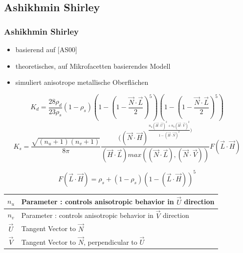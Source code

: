 \documentclass[11pt]{beamer}
\begin{document}
\subsection{Ashikhmin Shirley}
\begin{frame}[allowframebreaks]
\frametitle{Ashikhmin Shirley}

\begin{itemize}
\item basierend auf [AS00]
\item theoretisches, auf Mikrofacetten basierendes Modell
\item simuliert anisotrope metallische Oberflächen
\end{itemize}

\begin{equation}
K_d = \frac{28 \rho_d}{23 \rho_s} (1 - \rho_s)\left(1-\left(1- \frac{\vec{N} \cdot \vec{L}}{2}\right)^5\right)\left(1-\left(1-\frac{\vec{N} \cdot \vec{L}}{2}\right)^5\right)
\end{equation}
\begin{equation}
K_s = \frac{\sqrt{(n_u+1)(n_v+1)}}{8\pi} \frac{((\vec{N} \cdot \vec{H})^{ \frac{n_u(\vec{H} \cdot \vec{U})^2 + n_v(\vec{H} \cdot \vec{V})^2}{1-(\vec{H} \cdot \vec{N})^2})}}{(\vec{H} \cdot \vec{L}) max((\vec{N} \cdot \vec{L}),(\vec{N} \cdot \vec{V}))} F(\vec{L} \cdot \vec{H})
\end{equation}

\framebreak
\begin{equation}
F(\vec{L} \cdot \vec{H}) = \rho_s + (1-\rho_s)(1-(\vec{L} \cdot \vec{H}))^5
\end{equation}

\begin{table}[H]
\begin{tabular}{| c | l |}
\hline
$n_u$ & Parameter : controls anisotropic behavior in $\vec{U}$ direction\\ \hline
$n_v$ & Parameter : controls anisotropic behavior in $\vec{V}$ direction\\ \hline
$\vec{U}$ & Tangent Vector to $\vec{N}$\\ \hline
$\vec{V}$ & Tangent Vector to $\vec{N}$, perpendicular to $\vec{U}$\\ \hline
\end{tabular}
\end{table}

\framebreak

\begin{figure}[H]
\centering


\end{figure}
\end{frame}
\end{document}
